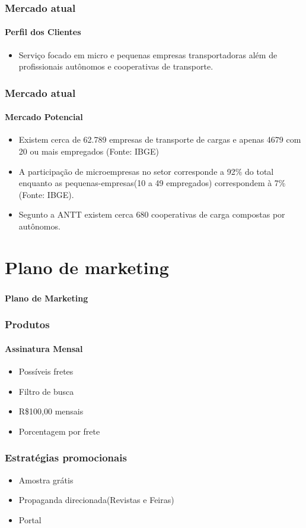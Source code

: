\documentclass{beamer}
\begin{document}
\begin{frame}
  \frametitle{Mercado atual}

  \framesubtitle{Perfil dos Clientes}
      \begin{itemize}
      \item Serviço focado em micro e pequenas empresas transportadoras além de profissionais autônomos e cooperativas de transporte.
      \end{itemize}
\end{frame}

\begin{frame}
  \frametitle{Mercado atual}
  \framesubtitle{Mercado Potencial}
      \begin{itemize}
      \item Existem cerca de 62.789 empresas de transporte de cargas e apenas 4679 com 20 ou mais empregados (Fonte: IBGE)
      \item A participação de microempresas no setor corresponde a 92\% do total enquanto as pequenas-empresas(10 a 49 empregados) correspondem à 7\%(Fonte: IBGE).
      \item Segunto a ANTT existem cerca 680 cooperativas de carga compostas por autônomos.
      \end{itemize}
\end{frame}
\section{Plano de marketing}

\begin{frame}
  \frametitle{}
  \framesubtitle{}

  \begin{center}
    {\huge\textbf{Plano de Marketing}}
  \end{center}
\end{frame}

\begin{frame}
  \frametitle{Produtos}
  \framesubtitle{Assinatura Mensal}
	\begin{itemize}
	\item Possíveis fretes
	\item Filtro de busca
	\item R\$100,00 mensais
	\item Porcentagem por frete
	\end{itemize}

\end{frame}

\begin{frame}
  \frametitle{Estratégias promocionais}
  	\begin{itemize}
	\item Amostra grátis
	\item Propaganda direcionada(Revistas e Feiras)
	\item Portal
	\end{itemize}

\end{frame}
\end{document}
